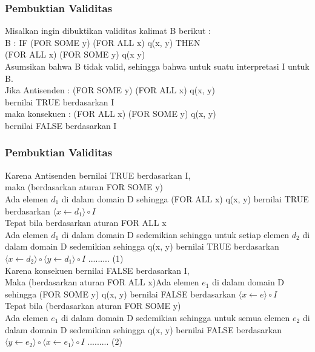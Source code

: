 \documentclass[handout]{beamer}
\theoremstyle{definition}
\theoremstyle{example}
\begin{document}
\begin{frame}
	\frametitle{Pembuktian Validitas}
	Misalkan ingin dibuktikan validitas kalimat B berikut :\\
	B :	IF (FOR SOME y) (FOR ALL x) q(x, y) THEN\\ 
	\hspace{5mm}(FOR ALL x) (FOR SOME y) q(x y)\\
	\vspace{2mm}
	Asumsikan bahwa B tidak valid, sehingga bahwa untuk suatu interpretasi I untuk B.\\
	\vspace{2mm}
	Jika Antisenden : (FOR SOME y) (FOR ALL x) q(x, y)\\
	\hspace{30mm}bernilai TRUE berdasarkan I\\
	maka konsekuen : (FOR ALL x) (FOR SOME y) q(x, y)\\
	\hspace{30mm}bernilai FALSE berdasarkan I
	
\end{frame}

\begin{frame}
	\frametitle{Pembuktian Validitas}
	Karena Antisenden bernilai TRUE berdasarkan  I,\\
	maka (berdasarkan aturan FOR SOME y)\\
	Ada elemen $d_1$ di dalam domain D sehingga (FOR ALL x) q(x, y) bernilai TRUE 
	berdasarkan $\langle x \leftarrow d_1 \rangle \circ I $\\
	\vspace{1mm}
	Tepat bila berdasarkan aturan FOR ALL x\\
	Ada elemen $d_1$ di dalam domain D sedemikian sehingga untuk setiap elemen $d_2$ di dalam domain D sedemikian sehingga q(x, y) bernilai TRUE berdasarkan $\langle x \leftarrow d_2 \rangle \circ \langle y \leftarrow d_1 \rangle \circ I $ ......... (1)\\
	\vspace{1mm}
	Karena konsekuen bernilai FALSE berdasarkan I,\\ 
	Maka (berdasarkan aturan FOR ALL x)Ada elemen $e_1$ di dalam domain D sehingga (FOR SOME y) q(x, y) bernilai FALSE 
	berdasarkan $\langle x \leftarrow e \rangle \circ I $\\
	\vspace{1mm}
	Tepat bila (berdasarkan aturan FOR SOME y)\\
	Ada elemen $e_1$ di dalam domain D sedemikian sehingga untuk semua elemen $e_2$ di dalam domain D sedemikian sehingga q(x, y) bernilai FALSE berdasarkan $\langle y \leftarrow e_2 \rangle \circ \langle x \leftarrow e_1 \rangle \circ I $ ......... (2)
	
\end{frame}
\end{document}
